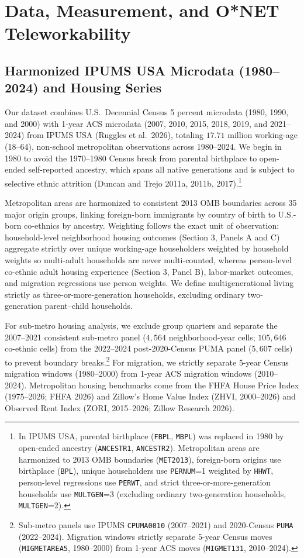 \documentclass[11pt]{article}
\begin{document}
\section{Data, Measurement, and O*NET Teleworkability}

\subsection{Harmonized IPUMS USA Microdata (1980--2024) and Housing Series}

Our dataset combines U.S.\ Decennial Census 5 percent microdata (1980, 1990, and 2000) with 1-year ACS microdata (2007, 2010, 2015, 2018, 2019, and 2021--2024) from IPUMS USA (Ruggles et al.\ 2026), totaling $17.71$ million working-age (18--64), non-school metropolitan observations across 1980--2024. We begin in 1980 to avoid the 1970--1980 Census break from parental birthplace to open-ended self-reported ancestry, which spans all native generations and is subject to selective ethnic attrition (Duncan and Trejo 2011a, 2011b, 2017).\footnote{In IPUMS USA, parental birthplace (\texttt{FBPL}, \texttt{MBPL}) was replaced in 1980 by open-ended ancestry (\texttt{ANCESTR1}, \texttt{ANCESTR2}). Metropolitan areas are harmonized to 2013 OMB boundaries (\texttt{MET2013}), foreign-born origins use birthplace (\texttt{BPL}), unique householders use \texttt{PERNUM}=1 weighted by \texttt{HHWT}, person-level regressions use \texttt{PERWT}, and strict three-or-more-generation households use \texttt{MULTGEN}=3 (excluding ordinary two-generation households, \texttt{MULTGEN}=2).}

Metropolitan areas are harmonized to consistent 2013 OMB boundaries across 35 major origin groups, linking foreign-born immigrants by country of birth to U.S.-born co-ethnics by ancestry. Weighting follows the exact unit of observation: household-level neighborhood housing outcomes (Section 3, Panels A and C) aggregate strictly over unique working-age householders weighted by household weights so multi-adult households are never multi-counted, whereas person-level co-ethnic adult housing experience (Section 3, Panel B), labor-market outcomes, and migration regressions use person weights. We define multigenerational living strictly as three-or-more-generation households, excluding ordinary two-generation parent--child households.

For sub-metro housing analysis, we exclude group quarters and separate the 2007--2021 consistent sub-metro panel ($4{,}564$ neighborhood-year cells; $105{,}646$ co-ethnic cells) from the 2022--2024 post-2020-Census PUMA panel ($5{,}607$ cells) to prevent boundary breaks.\footnote{Sub-metro panels use IPUMS \texttt{CPUMA0010} (2007--2021) and 2020-Census \texttt{PUMA} (2022--2024). Migration windows strictly separate 5-year Census moves (\texttt{MIGMETAREA5}, 1980--2000) from 1-year ACS moves (\texttt{MIGMET131}, 2010--2024).} For migration, we strictly separate 5-year Census migration windows (1980--2000) from 1-year ACS migration windows (2010--2024). Metropolitan housing benchmarks come from the FHFA House Price Index (1975--2026; FHFA 2026) and Zillow's Home Value Index (ZHVI, 2000--2026) and Observed Rent Index (ZORI, 2015--2026; Zillow Research 2026).
\end{document}
